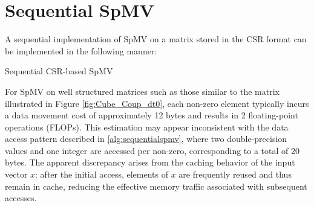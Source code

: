 \section{Sequential SpMV}
A sequential implementation of SpMV on a matrix stored in the CSR format can be implemented in the following manner:
\medskip

\begin{algorithm}[htbp]
    \caption{Sequential CSR-based SpMV}
    \SetAlgoVlined

\end{algorithm}
\label{alg:sequentialspmv}
\medskip



For SpMV on well structured matrices such as those similar to the matrix illustrated in Figure \ref{fig:Cube_Coup_dt0}, each non-zero element typically incurs a data movement cost of approximately 12 bytes and results in 2 floating-point operations (FLOPs). This estimation may appear inconsistent with the data access pattern described in \autoref{alg:sequentialspmv}, where two double-precision values and one integer are accessed per non-zero, corresponding to a total of 20 bytes. The apparent discrepancy arises from the caching behavior of the input vector \(x\): after the initial access, elements of \(x\) are frequently reused and thus remain in cache, reducing the effective memory traffic associated with subsequent accesses.
\medskip

